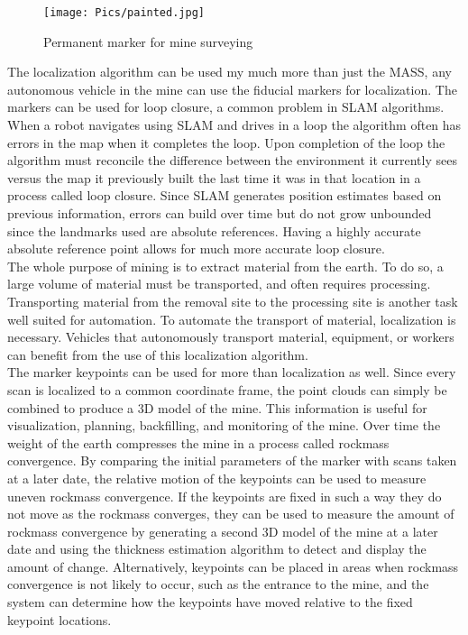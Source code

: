 \begin{figure}
    \centering
\texttt{[image: Pics/painted.jpg]} 
    \caption{Permanent marker for mine surveying}
    \label{fig:minepaint}
\end{figure}

The localization algorithm can be used my much more than just the MASS, any autonomous vehicle in the mine can use the fiducial markers for localization. The markers can be used for loop closure, a common problem in SLAM algorithms. When a robot navigates using SLAM and drives in a loop the algorithm often has errors in the map when it completes the loop. Upon completion of the loop the algorithm must reconcile the difference between the environment it currently sees versus the map it previously built the last time it was in that location in a process called loop closure. Since SLAM generates position estimates based on previous information, errors can build over time but do not grow unbounded since the landmarks used are absolute references. Having a highly accurate absolute reference point allows for much more accurate loop closure.\\

The whole purpose of mining is to extract material from the earth. To do so, a large volume of material must be transported, and often requires processing. Transporting material from the removal site to the processing site is another task well suited for automation. To automate the transport of material, localization is necessary. Vehicles that autonomously transport material, equipment, or workers can benefit from the use of this localization algorithm.\\

The marker keypoints can be used for more than localization as well. Since every scan is localized to a common coordinate frame, the point clouds can simply be combined to produce a 3D model of the mine. This information is useful for visualization, planning, backfilling, and monitoring of the mine. Over time the weight of the earth compresses the mine in a process called rockmass convergence. By comparing the initial parameters of the marker with scans taken at a later date, the relative motion of the keypoints can be used to measure uneven rockmass convergence. If the keypoints are fixed in such a way they do not move as the rockmass converges, they can be used to measure the amount of rockmass convergence by generating a second 3D model of the mine at a later date and using the thickness estimation algorithm to detect and display the amount of change. Alternatively, keypoints can be placed in areas when rockmass convergence is not likely to occur, such as the entrance to the mine, and the system can determine how the keypoints have moved relative to the fixed keypoint locations.\\

